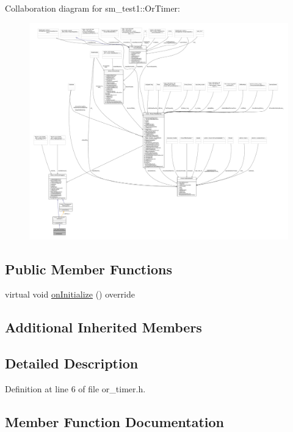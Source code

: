 Collaboration diagram for sm\+\_\+test1\+:\+:Or\+Timer\+:
\nopagebreak
\begin{figure}[H]
\begin{center}
\leavevmode
\includegraphics[width=350pt]{classsm__test1_1_1OrTimer__coll__graph}
\end{center}
\end{figure}
\subsection*{Public Member Functions}
\begin{DoxyCompactItemize}
\item 
virtual void \hyperlink{classsm__test1_1_1OrTimer_aa98ae1cc861d995cab9da3742c302e05}{on\+Initialize} () override
\end{DoxyCompactItemize}
\subsection*{Additional Inherited Members}


\subsection{Detailed Description}


Definition at line 6 of file or\+\_\+timer.\+h.



\subsection{Member Function Documentation}
